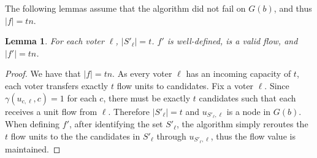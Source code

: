 \documentclass[letterpaper]{article} %
\newtheorem{lemma}{Lemma}
\newcommand{\abs}[1]{\lvert{#1}\rvert}
\begin{document}
The following lemmas assume that the algorithm did not fail on $G(b)$, and thus $\abs{f} = tn$.
\begin{lemma}
For each voter $\ell$, $\abs{S'_\ell}=t$. $f'$ is well-defined, is a valid flow, and  $\abs{f'} = tn$.
\end{lemma}
\begin{proof}
We have that $\abs{f} = tn$. As every voter $\ell$ has an incoming capacity of $t$, each voter transfers exactly $t$ flow units to candidates.
Fix a voter $\ell$. Since $\gamma(u_{c,\ell},c) = 1$ for each $c$, there must be exactly $t$ candidates
such that each receives a unit flow from $\ell$. Therefore $\abs{S'_\ell}=t$ and $u_{S'_\ell, \ell}$ is a node in $G(b)$. When defining $f'$, after identifying the set $S'_\ell$, the algorithm simply reroutes the $t$ flow units to the the candidates in $S'_\ell$ through $u_{S'_\ell, \ell}$, thus the flow value is maintained.
\end{proof}
\end{document}
